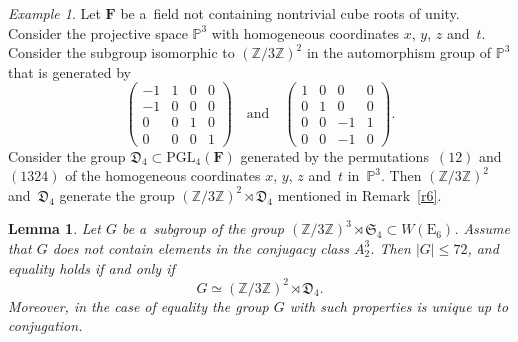 \documentclass{amsart}
\numberwithin{equation}{section}
\theoremstyle{plain}
\newtheorem{lemma}{Lemma}
\theoremstyle{definition}
\theoremstyle{remark}
\newtheorem{example}{Example}
\begin{document}
\begin{example}
\label{e4}
Let $\mathbf{F}$ be a~field not containing nontrivial cube roots of unity. Consider the projective space $\mathbb{P}^3$ with homogeneous coordinates $x$, $y$, $z$ and~$t$. Consider the subgroup isomorphic to $(\mathbb{Z}/3\mathbb{Z})^2$ in the automorphism group of $\mathbb{P}^3$ that is generated by
\begin{equation}
\label{eq7.4}
\begin{pmatrix}
-1 & 1 & 0 & 0\\
-1 & 0 & 0 & 0\\
0 & 0 & 1 & 0\\
0 & 0 & 0 & 1
\end{pmatrix} \quad \text{and} \quad
\begin{pmatrix}
1 & 0 & 0 & 0\\
0 & 1 & 0 & 0\\
0 & 0 & -1 & 1\\
0 & 0 & -1 & 0
\end{pmatrix}.
\end{equation}
Consider the group $\mathfrak{D}_4 \subset \mathrm{PGL}_4(\mathbf{F})$ generated by the permutations~$(12)$ and~$(1324)$ of the homogeneous coordinates $x$, $y$, $z$ and~$t$ in~$\mathbb{P}^3$. Then $(\mathbb{Z}/3\mathbb{Z})^2$ and~$\mathfrak{D}_4$ generate the group $(\mathbb{Z}/3\mathbb{Z})^2 \rtimes \mathfrak{D}_4$ mentioned in Remark~\ref{r6}.
\end{example}

\begin{lemma}
\label{l51}
Let $G$ be a~subgroup of the group $ (\mathbb{Z}/3\mathbb{Z})^3 \rtimes \mathfrak{S}_4 \subset W(\mathrm{E}_6)$. Assume that $G$ does not contain elements in the conjugacy class $A^3_2$. Then $|G| \leqslant 72$, and equality holds if and only if
$$
G \simeq (\mathbb{Z}/3\mathbb{Z})^2 \rtimes \mathfrak{D}_4.
$$
Moreover, in the case of equality the group $G$ with such properties is unique up to conjugation.
\end{lemma}
\end{document}
